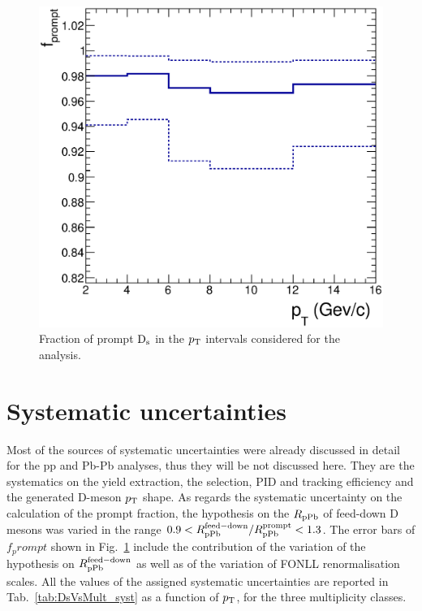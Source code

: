 \begin{figure}[htpb]
\centering
 \includegraphics[width=.7\textwidth]{FigCap6/DsFPrompt.eps}
  \caption{Fraction of prompt ${\rm D_s}$ in the $p_{\rm T}$ intervals considered for the analysis.}
 \label{fig:DsfPrompt}
\end{figure}

\section {Systematic uncertainties}
\label{sec:systpA}
Most of the sources of systematic uncertainties were already discussed
in detail for the pp and Pb-Pb analyses, thus they will be not
discussed here. They are the systematics on the yield extraction, 
the selection, PID and tracking efficiency and the generated D-meson $p_{\rm T}$ shape.
As regards the systematic uncertainty on the calculation of the prompt 
fraction, the hypothesis on the $R_{\rm pPb}$ of feed-down D mesons 
was varied in the range $0.9 <R_{\rm pPb}^{\rm feed-down}/R_{\rm pPb}^{\rm prompt} < 1.3$.
The error bars of $f_prompt$ shown in Fig.~\ref{fig:DsfPrompt} include the
contribution of the variation of the hypothesis on $R_{\rm pPb}^{\rm feed-down}$ 
as well as of the variation of FONLL renormalisation scales. 
All the values of the assigned systematic uncertainties are reported
in Tab.~\ref{tab:DsVsMult_syst} as a function of $p_{\rm T}$, for the 
three multiplicity classes. \\


